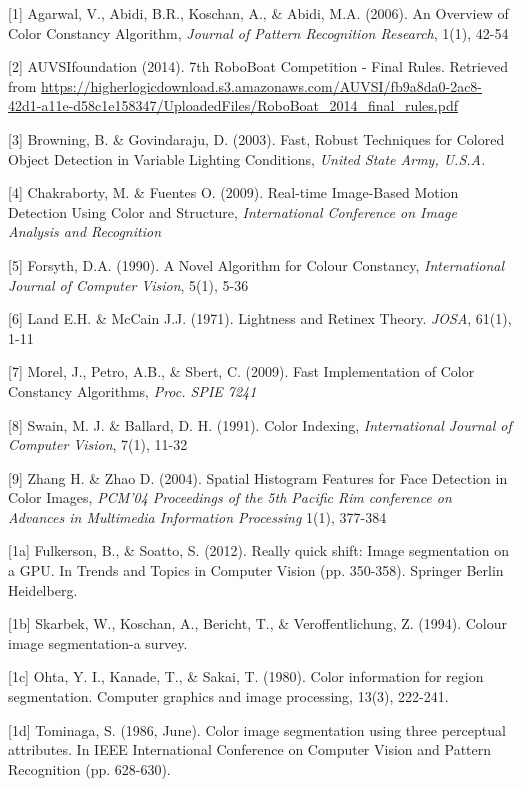 \documentclass{article} %
\begin{document}
\small{

[1]  Agarwal, V., Abidi, B.R., Koschan, A., \& Abidi, M.A. (2006). An Overview of Color Constancy Algorithm, {\it Journal of Pattern Recognition Research}, 1(1), 42-54

[2] AUVSIfoundation (2014). 7th RoboBoat Competition - Final Rules. Retrieved from
\url{https://higherlogicdownload.s3.amazonaws.com/AUVSI/fb9a8da0-2ac8-42d1-a11e-d58c1e158347/UploadedFiles/RoboBoat_2014_final_rules.pdf}

[3] Browning, B. \& Govindaraju, D. (2003). Fast, Robust Techniques for Colored Object Detection in Variable Lighting Conditions, {\it United State Army, U.S.A.}

[4] Chakraborty, M. \& Fuentes O. (2009). Real-time Image-Based Motion Detection Using Color and Structure, {\it International Conference on Image Analysis and Recognition}

[5] Forsyth, D.A. (1990). A Novel Algorithm for Colour Constancy, {\it International Journal of Computer Vision}, 5(1), 5-36

[6] Land E.H. \& McCain J.J. (1971). Lightness and Retinex Theory. {\it JOSA}, 61(1), 1-11

[7] Morel, J., Petro, A.B., \& Sbert, C. (2009). Fast Implementation of Color Constancy Algorithms, {\it Proc. SPIE 7241}

[8] Swain, M. J. \& Ballard, D. H. (1991). Color Indexing, {\it International Journal of Computer Vision}, 7(1), 11-32

[9] Zhang H. \& Zhao D. (2004). Spatial Histogram Features for Face Detection in Color Images, {\it PCM'04 Proceedings of the 5th Pacific Rim conference on Advances in Multimedia Information Processing} 1(1), 377-384 

[1a] Fulkerson, B., \& Soatto, S. (2012). Really quick shift: Image segmentation on a GPU. In Trends and Topics in Computer Vision (pp. 350-358). Springer Berlin Heidelberg.

[1b] Skarbek, W., Koschan, A., Bericht, T., \& Veroffentlichung, Z. (1994). Colour image segmentation-a survey.

[1c] Ohta, Y. I., Kanade, T., \& Sakai, T. (1980). Color information for region segmentation. Computer graphics and image processing, 13(3), 222-241.

[1d] Tominaga, S. (1986, June). Color image segmentation using three perceptual attributes. In IEEE International Conference on Computer Vision and Pattern Recognition (pp. 628-630).

}
\end{document}
